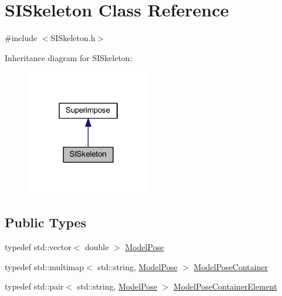 \hypertarget{classSISkeleton}{}\section{S\+I\+Skeleton Class Reference}
\label{classSISkeleton}


{\ttfamily \#include $<$S\+I\+Skeleton.\+h$>$}



Inheritance diagram for S\+I\+Skeleton\+:\nopagebreak
\begin{figure}[H]
\begin{center}
\leavevmode
\includegraphics[width=154pt]{classSISkeleton__inherit__graph}
\end{center}
\end{figure}
\subsection*{Public Types}
\begin{DoxyCompactItemize}
\item 
typedef std\+::vector$<$ double $>$ \mbox{\hyperlink{classSuperimpose_a85d40a5caf19f486d1e0c15c0a025378}{Model\+Pose}}
\item 
typedef std\+::multimap$<$ std\+::string, \mbox{\hyperlink{classSuperimpose_a85d40a5caf19f486d1e0c15c0a025378}{Model\+Pose}} $>$ \mbox{\hyperlink{classSuperimpose_a178e3d4e2def6635bfcf9454dd4b5d22}{Model\+Pose\+Container}}
\item 
typedef std\+::pair$<$ std\+::string, \mbox{\hyperlink{classSuperimpose_a85d40a5caf19f486d1e0c15c0a025378}{Model\+Pose}} $>$ \mbox{\hyperlink{classSuperimpose_a1e02e0225687b42296dcfee4eadf8a55}{Model\+Pose\+Container\+Element}}
\end{DoxyCompactItemize}
